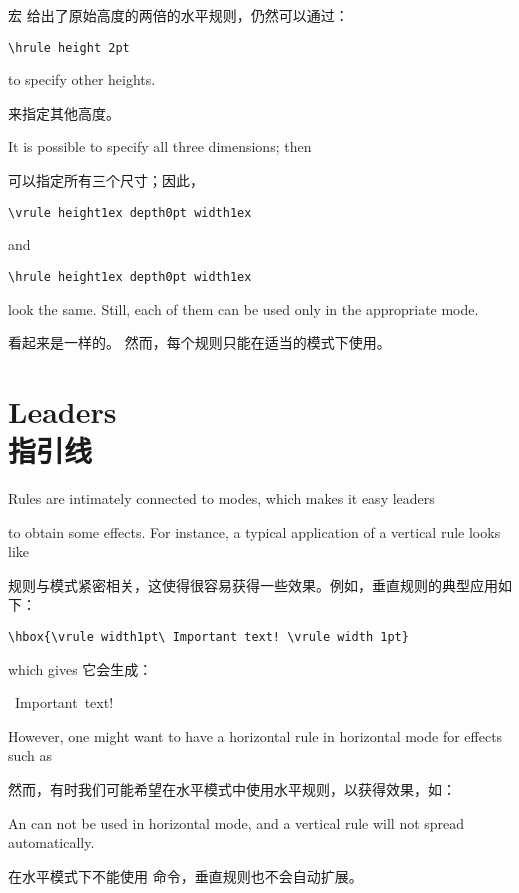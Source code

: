 宏  给出了原始高度的两倍的水平规则，仍然可以通过：
\begin{verbatim}
\hrule height 2pt
\end{verbatim}
to specify other heights.

来指定其他高度。

It is possible to specify all three dimensions; then

可以指定所有三个尺寸；因此，
\begin{verbatim}
\vrule height1ex depth0pt width1ex
\end{verbatim}
and
\begin{verbatim}
\hrule height1ex depth0pt width1ex
\end{verbatim}
look the same.
Still, each of them can be used only in the appropriate mode.

看起来是一样的。
然而，每个规则只能在适当的模式下使用。


\section{Leaders\\指引线}

Rules are intimately connected to modes, which makes it easy
\term leaders\par
to obtain some effects. For instance, a typical application
of a vertical rule looks like

规则与模式紧密相关，这使得很容易获得一些效果。例如，垂直规则的典型应用如下：
\begin{verbatim}
\hbox{\vrule width1pt\ Important text! \vrule width 1pt}
\end{verbatim}
which gives
它会生成： \begin{disp}\leavevmode\hbox{\vrule width 1pt\ Important text! 
                      \vrule width 1pt}\end{disp}
However, one might want to have a horizontal rule
in horizontal mode for effects such as

然而，有时我们可能希望在水平模式中使用水平规则，以获得效果，如：
An  can not be used in horizontal mode, and
a vertical rule will not spread automatically.

在水平模式下不能使用  命令，垂直规则也不会自动扩展。

